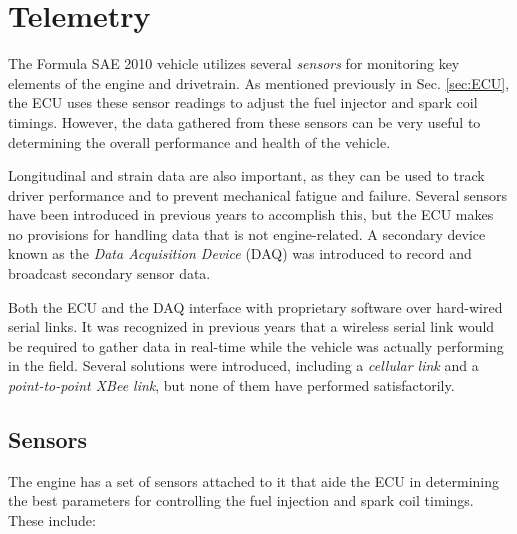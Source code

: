 \section{Telemetry}

The Formula SAE 2010 vehicle utilizes several \emph{sensors} for monitoring key elements of the engine and drivetrain. As mentioned previously in Sec. \ref{sec:ECU}, the ECU uses these sensor readings to adjust the fuel injector and spark coil timings. However, the data gathered from these sensors can be very useful to determining the overall performance and health of the vehicle. 

Longitudinal and strain data are also important, as they can be used to track driver performance and to prevent mechanical fatigue and failure. Several sensors have been introduced in previous years to accomplish this, but the ECU makes no provisions for handling data that is not engine-related. A secondary device known as the \emph{Data Acquisition Device} (DAQ)  was introduced to record and broadcast secondary sensor data.

Both the ECU and the DAQ interface with proprietary software over hard-wired serial links. It was recognized in previous years that a wireless serial link would be required to gather data in real-time while the vehicle was actually performing in the field. Several solutions were introduced, including a \emph{cellular link} and a \emph{point-to-point XBee link}, but none of them have performed satisfactorily.

\subsection{Sensors}

The engine has a set of sensors attached to it that aide the ECU in determining the best parameters for controlling the fuel injection and spark coil timings. These include:

